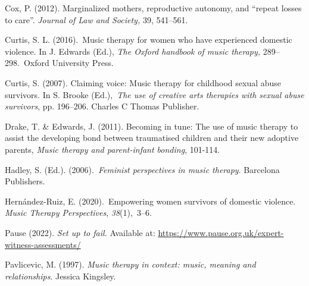 \documentclass[authordate, empirical]{jote-new-article}
\begin{document}
Cox, P. (2012). Marginalized mothers, reproductive autonomy, and “repeat losses to care”. \emph{Journal of Law and Society,} 39, 541--561.







Curtis, S. L. (2016). Music therapy for women who have experienced domestic violence. In J. Edwards (Ed.), \emph{The Oxford handbook of music therapy,} 289--298. Oxford University Press.







Curtis, S. (2007). Claiming voice: Music therapy for childhood sexual abuse survivors. In S. Brooke (Ed.), \emph{The use of creative arts therapies with sexual abuse survivors}, pp. 196--206. Charles C Thomas Publisher.







Drake, T. \& Edwards, J. (2011). Becoming in tune: The use of music therapy to assist the developing bond between traumatised children and their new adoptive parents, \emph{Music therapy and parent-infant bonding}, 101-114.







Hadley, S. (Ed.). (2006). \emph{Feminist perspectives in music therapy}. Barcelona Publishers.







Hernández-Ruiz, E. (2020). Empowering women survivors of domestic violence. \emph{Music Therapy Perspectives}, \emph{38}(1), 3--6.







Pause (2022). \emph{Set up to fail. }Available at: \href{https://www.pause.org.uk/expert-witness-assessments/}{https://www.pause.org.uk/expert-witness-assessments/}







Pavlicevic, M. (1997). \emph{Music therapy in context: music, meaning and relationships}. Jessica Kingsley.
\end{document}
